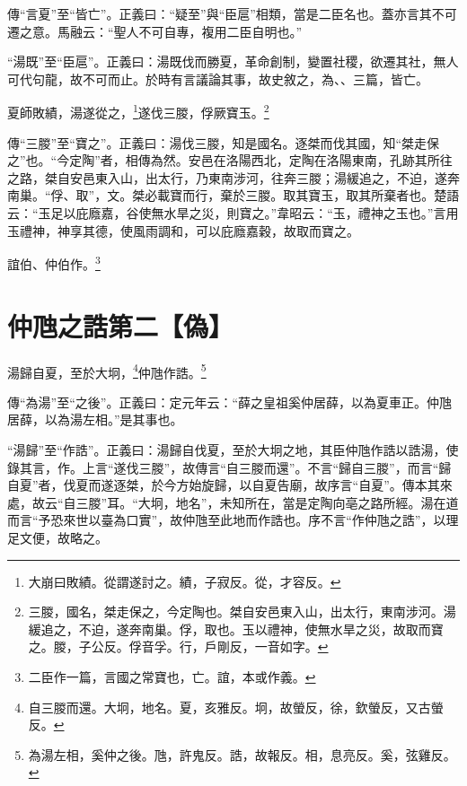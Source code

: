 {\noindent\zhuan{}\fzbyks 傳“言夏”至“皆亡”。正義曰：“疑至”與“臣扈”相類，當是二臣名也。蓋亦言其不可遷之意。馬融云：“聖人不可自專，複用二臣自明也。” \par}

{\noindent\shu{}\fzkt “湯既”至“臣扈”。正義曰：湯既伐而勝夏，革命創制，變置社稷，欲遷其社，無人可代句龍，故不可而止。於時有言議論其事，故史敘之，為、、三篇，皆亡。 \par}

夏師敗績，湯遂從之，\footnote{大崩曰敗績。從謂遂討之。績，子寂反。從，才容反。}遂伐三朡，俘厥寶玉。\footnote{三朡，國名，桀走保之，今定陶也。桀自安邑東入山，出太行，東南涉河。湯緩追之，不迫，遂奔南巢。俘，取也。玉以禮神，使無水旱之災，故取而寶之。朡，子公反。俘音孚。行，戶剛反，一音如字。}

{\noindent\shu{}\fzkt 傳“三朡”至“寶之”。正義曰：湯伐三朡，知是國名。逐桀而伐其國，知“桀走保之”也。“今定陶”者，相傳為然。安邑在洛陽西北，定陶在洛陽東南，孔跡其所往之路，桀自安邑東入山，出太行，乃東南涉河，往奔三朡；湯緩追之，不迫，遂奔南巢。“俘、取”，文。桀必載寶而行，棄於三朡。取其寶玉，取其所棄者也。楚語云：“玉足以庇廕嘉，谷使無水旱之災，則寶之。”韋昭云：“玉，禮神之玉也。”言用玉禮神，神享其德，使風雨調和，可以庇廕嘉穀，故取而寶之。 \par}

誼伯、仲伯作。\footnote{二臣作一篇，言國之常寶也，亡。誼，本或作義。}

\section{仲虺之誥第二【偽】}

湯歸自夏，至於大坰，\footnote{自三朡而還。大坰，地名。夏，亥雅反。坰，故螢反，徐，欽螢反，又古螢反。}仲虺作誥。\footnote{為湯左相，奚仲之後。虺，許鬼反。誥，故報反。相，息亮反。奚，弦雞反。}


{\noindent\zhuan{}\fzbyks 傳“為湯”至“之後”。正義曰：定元年云：“薛之皇祖奚仲居薛，以為夏車正。仲虺居薛，以為湯左相。”是其事也。 \par}

{\noindent\shu{}\fzkt “湯歸”至“作誥”。正義曰：湯歸自伐夏，至於大坰之地，其臣仲虺作誥以誥湯，使錄其言，作。上言“遂伐三朡”，故傳言“自三朡而還”。不言“歸自三朡”，而言“歸自夏”者，伐夏而遂逐桀，於今方始旋歸，以自夏告廟，故序言“自夏”。傳本其來處，故云“自三朡”耳。“大坰，地名”，未知所在，當是定陶向亳之路所經。湯在道而言“予恐來世以臺為口實”，故仲虺至此地而作誥也。序不言“作仲虺之誥”，以理足文便，故略之。 \par}

